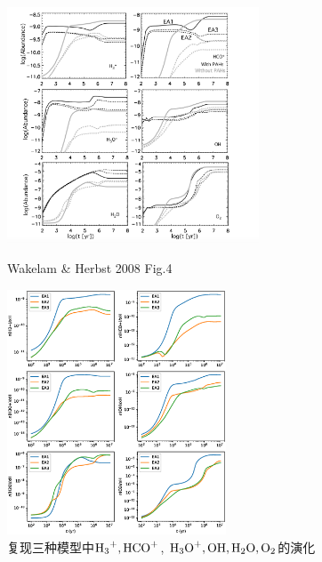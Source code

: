 \documentclass[UTF8]{article}
\begin{document}
\begin{fangsong}
\begin{figure}[htbp]
	\centering
	\begin{minipage}[t]{0.49\textwidth}
		\centering
		\includegraphics[width=7.5cm]{Wakelam2.png}
		\caption{Wakelam \& Herbst 2008 Fig.4}
	\end{minipage}
	\begin{minipage}[t]{0.49\textwidth}
		\centering
		\includegraphics[width=6.5cm]{2.eps}
		\caption{复现三种模型中$\ce{H3+,HCO+}$, $\ce{H3O+,OH,H2O,O2}$的演化}
	\end{minipage}
\end{figure}


\end{fangsong}
\end{document}
